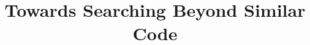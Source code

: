 \documentclass[conference]{IEEEtran}
\begin{document}
	
	\newcommand\todo[1]{\textcolor{red}{TODO: #1}}
	
	\makeatletter
	\newcommand{\removelatexerror}{\let\@latex@error\@gobble}
	\makeatother
	


\title{Towards Searching Beyond Similar Code}


\end{document}
